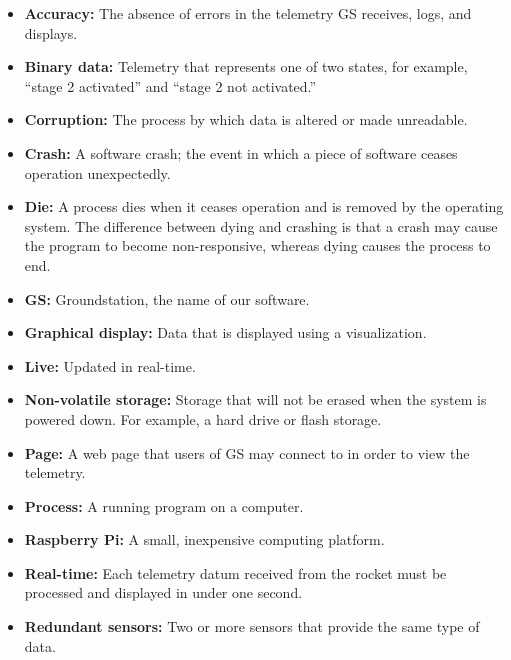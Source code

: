 \documentclass[10pt,draftclsnofoot,onecolumn]{IEEEtran}
\begin{document}
	\begin{itemize}
		\item \textbf{Accuracy:} The absence of errors in the telemetry GS receives, logs, and displays.
		\item \textbf{Binary data:} Telemetry that represents one of two states, for example, ``stage 2 activated'' and
		``stage 2 not activated.''
		\item \textbf{Corruption:} The process by which data is altered or made unreadable.
		\item \textbf{Crash:} A software crash; the event in which a piece of software ceases operation unexpectedly.
		\item \textbf{Die:} A process dies when it ceases operation and is removed by the operating system.
		The difference between dying and crashing is that a crash may cause the program to become non-responsive,
		whereas dying causes the process to end.
		\item \textbf{GS:} Groundstation, the name of our software.
		\item \textbf{Graphical display:} Data that is displayed using a visualization.
		\item \textbf{Live:} Updated in real-time.
		\item \textbf{Non-volatile storage:} Storage that will not be erased when the system is powered down.
		For example, a hard drive or flash storage.
		\item \textbf{Page:} A web page that users of GS may connect to in order to view the telemetry.
		\item \textbf{Process:} A running program on a computer.
		\item \textbf{Raspberry Pi:} A small, inexpensive computing platform.		
		\item \textbf{Real-time:} Each telemetry datum received from the rocket must be processed and
		displayed in under one second.
		\item \textbf{Redundant sensors:} Two or more sensors that provide the same type of data.

\end{itemize}
\end{document}
